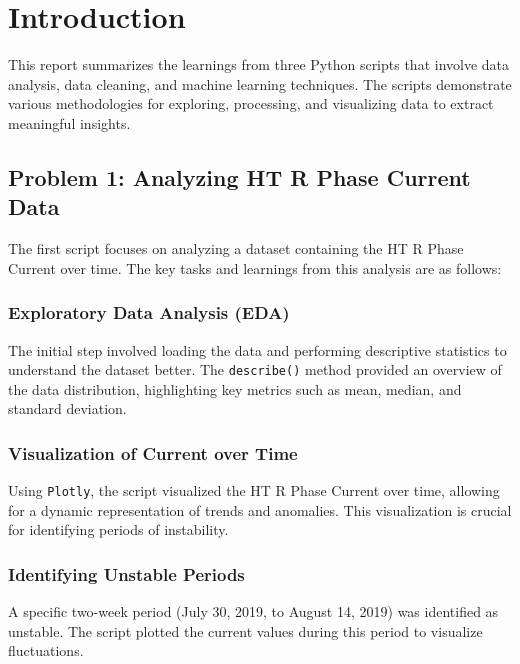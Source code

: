 \documentclass{article}
\begin{document}
\thispagestyle{empty}

\titleBC





\section{Introduction}
This report summarizes the learnings from three Python scripts that involve data analysis, data cleaning, and machine learning techniques. The scripts demonstrate various methodologies for exploring, processing, and visualizing data to extract meaningful insights.

\subsection{Problem 1: Analyzing HT R Phase Current Data}
The first script focuses on analyzing a dataset containing the HT R Phase Current over time. The key tasks and learnings from this analysis are as follows:

\subsubsection{Exploratory Data Analysis (EDA)}
The initial step involved loading the data and performing descriptive statistics to understand the dataset better. The \texttt{describe()} method provided an overview of the data distribution, highlighting key metrics such as mean, median, and standard deviation.

\subsubsection{Visualization of Current over Time}
Using \texttt{Plotly}, the script visualized the HT R Phase Current over time, allowing for a dynamic representation of trends and anomalies. This visualization is crucial for identifying periods of instability.

\subsubsection{Identifying Unstable Periods}
A specific two-week period (July 30, 2019, to August 14, 2019) was identified as unstable. The script plotted the current values during this period to visualize fluctuations.
\end{document}
